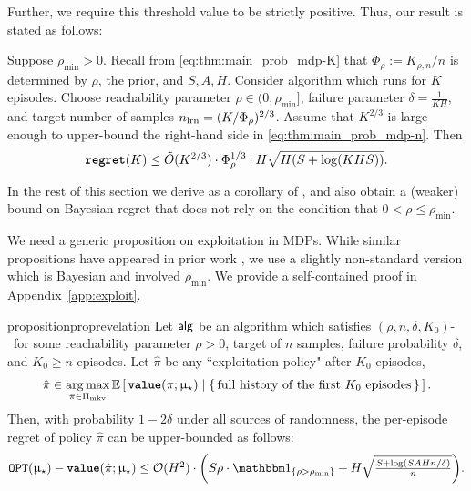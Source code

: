 Further, we require this threshold value to be strictly positive. Thus, our result is stated as follows:

\begin{theorem}\label{cor:Bayesian-regret-nice}
Suppose $\rho_{\min}>0$. Recall from \eqref{eq:thm:main_prob_mdp-K} that
    $\Phi_\rho := K_{\rho,n}/ n$
is determined by $\rho$, the prior, and $S,A,H$. Consider algorithm \HHandExploit which runs for $K$ episodes. Choose reachability parameter $\rho\in (0,\rho_{\min}]$, failure parameter $\delta = \frac{1}{KH}$, and target number of samples $n_{\mathrm{lrn}} = (K/\Phi_\rho)^{2/3}$. Assume that $K^{2/3}$ is large enough to upper-bound the right-hand side in \eqref{eq:thm:main_prob_mdp-n}.
Then
\[ {\normalfont \texttt{\textbf{regret}}}(K) \leq \tilde{O}(K^{2/3})\cdot \Phi_\rho^{1/3}\cdot H \sqrt{H(S + \log(KHS))}.\]
\end{theorem}

In the rest of this section we derive  as a corollary of , and also obtain a (weaker) bound on Bayesian regret that does not rely on the condition that $0<\rho\leq \rho_{\min}$.

We need a generic proposition on exploitation in MDPs. While similar propositions have appeared in prior work \cite[\eg][]{jin2020reward}, we use a slightly non-standard version which is Bayesian and involved $\rho_{\min}$. We provide a self-contained proof in Appendix~\ref{app:exploit}.

\newcommand{\vepslearn}{\varepsilon_{\mathrm{lrn}}}


\begin{restatable}[Exploitation]{proposition}{proprevelation}\label{prop:revelation}
Let $\mathsf{alg}$ be an algorithm which satisfies $(\rho,n,\delta,K_0)$-\traversal\ for some reachability parameter $\rho>0$, target of $n$ samples, failure probability $\delta$, and $K_0\geq n$ episodes. Let $\hat\pi$ be any ``exploitation policy" after $K_0$ episodes, \ie
\begin{align*}
\hat \pi \in \operatorname*{arg\,max}_{\pi\in \Pi_{\mathrm{mkv}}}
    \mathbb{E}\left[\, {\normalfont \texttt{\textbf{value}}}(\pi;\upmu_{\star}) \mid \left\{\,\text{full history of the first $K_0$ episodes}\,\right\}\,\right].
    \end{align*}
Then, with probability $1 - 2\delta$ under all sources of randomness, the per-episode regret of policy $\hat \pi$ can be upper-bounded as follows:
\begin{align}\label{eq:cor:simple-regret_hi_prob}
\OPT(\modst) - \valuef{\hat{\pi}}{\modst}     \leq {\textstyle \mathcal{O}(H^2)\cdot\left(S \rho \cdot \ind_{\{\rho > \rho_{\min}\}}+ H\sqrt{\frac{S + \log(SAHn/\delta)}{n}}\right)}.
\end{align}
\end{restatable}

